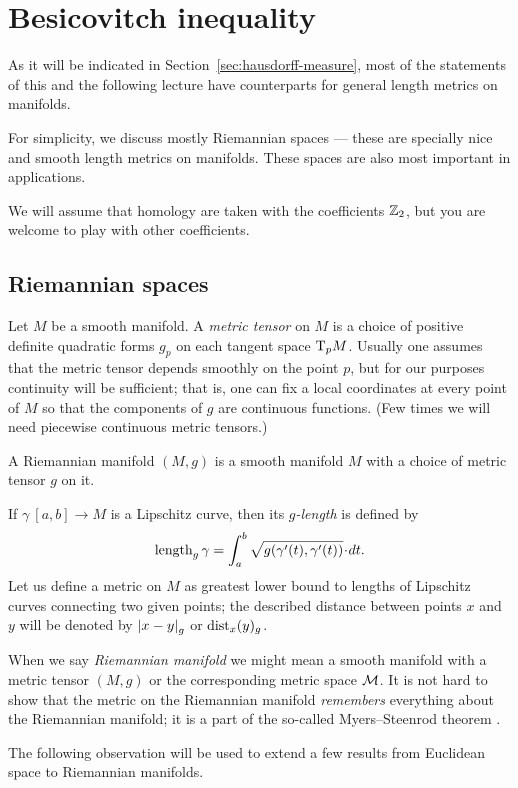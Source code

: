 \chapter{Besicovitch inequality} 

As it will be indicated in Section~\ref{sec:hausdorff-measure},
most of the statements of this and the following lecture have counterparts for general length metrics on manifolds.

For simplicity, we discuss mostly Riemannian spaces --- these are specially nice and smooth length metrics on manifolds.
These spaces are also most important in applications.

We will assume that homology are taken with the coefficients $\mathbb{Z}_2$, but you are welcome to play with other coefficients.

\section{Riemannian spaces}

Let $M$ be a smooth manifold.
A \emph{metric tensor} on $M$ is a choice of positive definite quadratic forms $g_p$ on each tangent space $\mathrm{T}_pM$.
Usually one assumes that the metric tensor depends smoothly on the point $p$,
but for our purposes continuity will be sufficient;
that is, one can fix a local coordinates at every point of $M$ so that the components of $g$ are continuous functions.
(Few times we will need piecewise continuous metric tensors.)

A Riemannian manifold $(M,g)$ is a smooth manifold $M$ with a choice of metric tensor $g$ on it.


If $\gamma\:[a,b]\to M$ is a Lipschitz curve, then its \emph{$g$-length} is defined by
\[\length_g\gamma=\int_a^b\sqrt{g(\gamma'(t),\gamma'(t))}\cdot dt.\]
Let us define a metric on $M$ as greatest lower bound to lengths of Lipschitz curves connecting two given points;
the described distance between points $x$ and $y$ will be denoted by $\dist{x}{y}{g}$ or $\mathrm{dist}_x(y)_g$.

When we say \emph{Riemannian manifold} we might mean a smooth manifold with a metric tensor $(M,g)$ or the corresponding metric space $\mathcal{M}$. 
It is not hard to show that the metric on the Riemannian manifold {}\emph{remembers} everything about the Riemannian manifold;
it is a part of the so-called Myers--Steenrod theorem \cite{myers-steenrod}.

The following observation will be used to extend a few results from Euclidean space to Riemannian manifolds.

